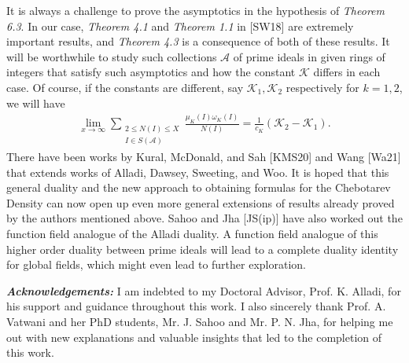 \documentclass[12pt]{article}
\numberwithin{equation}{section}
\numberwithin{equation}{section}
\begin{document}
 \noindent It is always a challenge to prove the asymptotics in the hypothesis of \textit{Theorem 6.3}. In our case, \textit{Theorem 4.1} and \textit{Theorem 1.1} in [SW18] are extremely important results, and  \textit{Theorem 4.3} is a consequence of both of these results. It will be worthwhile to study such collections $\mathcal{A}$ of prime ideals in given rings of integers that satisfy such asymptotics and how the constant $\mathcal{K}$ differs in each case. Of course, if the constants are different, say $\mathcal{K}_1,\mathcal{K}_2$ respectively for $k=1,2$, we will have
 \begin{align}
     \lim_{x\to \infty}\sum_{\substack{2\leq N(I) \leq X \\ I \in S(\mathcal{A})}}\frac{\mu_K(I)\omega_K(I)}{N(I)} = \frac{1}{c_K}(\mathcal{K}_2-\mathcal{K}_1). \nonumber 
 \end{align}
There have been works by Kural, McDonald, and Sah [KMS20] and Wang [Wa21] that extends works of Alladi, Dawsey, Sweeting, and Woo. It is hoped that this general duality and the new approach to obtaining formulas for the Chebotarev Density can now open up even more general extensions of results already proved by the authors mentioned above. Sahoo and Jha [JS(ip)] have also worked out the function field analogue of the Alladi duality. A function field analogue of this higher order duality between prime ideals will lead to a complete duality identity for global fields, which might even lead to further exploration.  

\vspace{1cm}
\noindent \textbf{\textit{Acknowledgements:}} I am indebted to my Doctoral Advisor, Prof. K. Alladi, for his support and guidance throughout this work. I also sincerely thank Prof. A. Vatwani and her PhD students, Mr. J. Sahoo and Mr. P. N. Jha, for helping me out with new explanations and valuable insights that led to the completion of this work.
\end{document}
